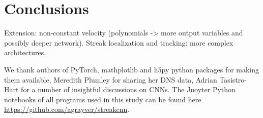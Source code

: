 \documentclass{svjour3}                     %
\begin{document}
\section{Conclusions}

Extension: non-constant velocity (polynomials -> more output variables and possibly deeper network).
Streak localization and tracking: more complex architectures.



\begin{acknowledgements}
We thank authors of PyTorch, mathplotlib and h5py python packages for making them available, Meredith Plumley for sharing her DNS data, Adrian Tasistro-Hart for a number of insightful discussions on CNNs. The Juoyter Python notebooks of all programs used in this study can be found here \url{https://github.com/agrayver/streakcnn}.
\end{acknowledgements}





\end{document}

